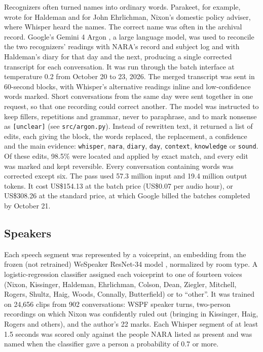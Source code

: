 Recognizers often turned names into ordinary words. Parakeet, for example, wrote  for Haldeman and  for John Ehrlichman, Nixon's domestic policy adviser, where Whisper heard the names. The correct name was often in the archival record. Google's Gemini 4 Argon \citep{google2026argon}, a large language model, was used to reconcile the two recognizers' readings with NARA's record and subject log and with Haldeman's diary for that day and the next, producing a single corrected transcript for each conversation. It was run through the batch interface at temperature 0.2 from October 20 to 23, 2026. The merged transcript was sent in 60-second blocks, with Whisper's alternative readings inline and low-confidence words marked. Short conversations from the same day were sent together in one request, so that one recording could correct another. The model was instructed to keep fillers, repetitions and grammar, never to paraphrase, and to mark nonsense as \texttt{[unclear]} (see \texttt{src/argon.py}). Instead of rewritten text, it returned a list of edits, each giving the block, the words replaced, the replacement, a confidence and the main evidence: \texttt{whisper}, \texttt{nara}, \texttt{diary}, \texttt{day}, \texttt{context}, \texttt{knowledge} or \texttt{sound}. Of these edits, 98.5\% were located and applied by exact match, and every edit was marked and kept reversible. Every conversation containing words was corrected except six. The pass used 57.3 million input and 19.4 million output tokens. It cost US\$154.13 at the batch price (US\$0.07 per audio hour), or US\$308.26 at the standard price, at which Google billed the batches completed by October 21.

\subsection{Speakers}
\label{sec:speakers}

Each speech segment was represented by a voiceprint, an embedding from the frozen (not retrained) WeSpeaker ResNet-34 model \citep{wang2023wespeaker}, normalized by room type. A logistic-regression classifier assigned each voiceprint to one of fourteen voices (Nixon, Kissinger, Haldeman, Ehrlichman, Colson, Dean, Ziegler, Mitchell, Rogers, Shultz, Haig, Woods, Connally, Butterfield) or to \enquote{other}. It was trained on 24,656 clips from 902 conversations: WSPF speaker turns, two-person recordings on which Nixon was confidently ruled out (bringing in Kissinger, Haig, Rogers and others), and the author's 22 marks. Each Whisper segment of at least 1.5 seconds was scored only against the people NARA listed as present and was named when the classifier gave a person a probability of 0.7 or more.

